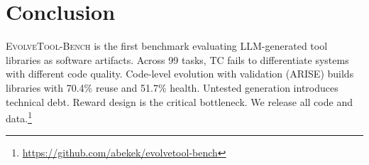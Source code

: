 \documentclass[10pt,twocolumn]{article}
\begin{document}
\section{Conclusion}

\textsc{EvolveTool-Bench} is the first benchmark evaluating LLM-generated tool libraries as software artifacts. Across 99 tasks, TC fails to differentiate systems with different code quality. Code-level evolution with validation (ARISE) builds libraries with 70.4\% reuse and 51.7\% health. Untested generation introduces technical debt. Reward design is the critical bottleneck. We release all code and data.\footnote{\url{https://github.com/abekek/evolvetool-bench}}



\end{document}
